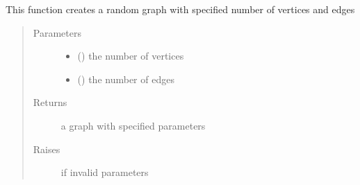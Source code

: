\documentclass[letterpaper,10pt,english]{sphinxmanual}
\begin{document}

\begin{fulllineitems}
\label{\detokenize{UndirectedGraph:UndirectedGraph.random_graph}}
This function creates a random graph with specified number of vertices and edges
\begin{quote}\begin{description}
\item[{Parameters}] \leavevmode\begin{itemize}
\item {} 
 () \textendash{} the number of vertices

\item {} 
 () \textendash{} the number of edges

\end{itemize}

\item[{Returns}] \leavevmode
a graph with specified parameters

\item[{Raises}] \leavevmode
{} \textendash{} if invalid parameters

\end{description}\end{quote}

\end{fulllineitems}

\end{document}
